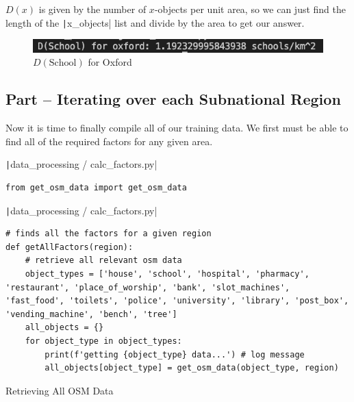\documentclass[12pt]{report}
\newcommand{\pil}[1]{\protect\texttt|#1|}
\begin{document}
$D\left(x\right)$ is given by the number of $x$-objects per unit area, so we can just find the length of the \pil{x_objects} list and divide by the area to get our answer.

\begin{center}
\end{center}

\begin{figure}[H]
\centering
\includegraphics[width=14cm]{ss4.3.png}
\caption{$D\left(\text{School}\right)$ for Oxford}\label{fig:ss4.3}
\end{figure}

\subsection{Part \theparts{} -- Iterating over each Subnational Region}

Now it is time to finally compile all of our training data. We first must be able to find all of the required factors for any given area.

\begin{listing}[H]
\pil{data_processing / calc_factors.py}
\begin{verbatim}
from get_osm_data import get_osm_data
\end{verbatim}
\pil{data_processing / calc_factors.py}
\begin{verbatim}
# finds all the factors for a given region
def getAllFactors(region):
    # retrieve all relevant osm data
    object_types = ['house', 'school', 'hospital', 'pharmacy', 'restaurant', 'place_of_worship', 'bank', 'slot_machines', 'fast_food', 'toilets', 'police', 'university', 'library', 'post_box', 'vending_machine', 'bench', 'tree']
    all_objects = {}
    for object_type in object_types:
        print(f'getting {object_type} data...') # log message
        all_objects[object_type] = get_osm_data(object_type, region)
\end{verbatim}
\caption{Retrieving All OSM Data}\label{cs:retrieveAllData}
\end{listing}
\end{document}
